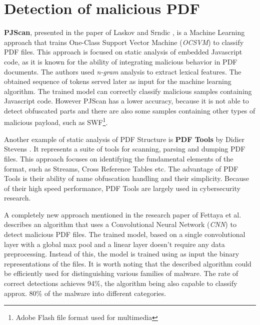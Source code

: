

\section{Detection of malicious PDF}
\label{section:relatedWorkML}
\textbf{PJScan}, presented in the paper of Laskov and Srndic \cite{pjscan}, is a Machine Learning approach that trains One-Class Support Vector Machine (\textit{OCSVM}) to classify PDF files. This approach is focused on static analysis of embedded Javascript code, as it is known for the ability of integrating malicious behavior in PDF documents. The authors used \textit{n-gram} analysis to extract lexical features. The obtained sequence of tokens served later as input for the machine learning algorithm. The trained model can correctly classify malicious samples containing Javascript code. However PJScan has a lower accuracy, because it is not able to detect obfuscated parts and there are also some samples containing other types of malicious payload, such as SWF\footnote{Adobe Flash file format used for multimedia}. \par
Another example of static analysis of PDF Structure is \textbf{PDF Tools} by Didier Stevens \cite{pdftools}. It represents a suite of tools for scanning, parsing and dumping PDF files. This approach focuses on identifying the fundamental elements of the format, such as Streams, Cross Reference Tables etc. The advantage of PDF Tools is their ability of name obfuscation handling and their simplicity. Because of their high speed performance, PDF Tools are largely used in cybersecurity research. \par
A completely new approach mentioned in the research paper of Fettaya et al. \cite{deepdf} describes an algorithm that uses a Convolutional Neural Network (\textit{CNN}) to detect malicious PDF files. The trained model, based on a single convolutional layer with a global max pool and a linear layer doesn't require any data preprocessing. Instead of this, the model is trained using as input the binary representations of the files. It is worth noting that the described algorithm could be efficiently used for distinguishing various families of malware. The rate of correct detections achieves 94\%, the algorithm being also capable to classify approx. 80\% of the malware into different categories.